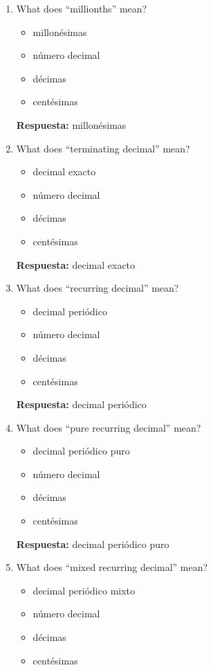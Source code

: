 \documentclass[11pt,a4paper]{article}
\begin{document}
\begin{enumerate}
\begin{itemize}
\item cienmilésimas
\item número decimal
\item décimas
\item centésimas
\end{itemize}
\textbf{Respuesta:} cienmilésimas
\item What does ``millionths'' mean?
\begin{itemize}
\item millonésimas
\item número decimal
\item décimas
\item centésimas
\end{itemize}
\textbf{Respuesta:} millonésimas
\item What does ``terminating decimal'' mean?
\begin{itemize}
\item decimal exacto
\item número decimal
\item décimas
\item centésimas
\end{itemize}
\textbf{Respuesta:} decimal exacto
\item What does ``recurring decimal'' mean?
\begin{itemize}
\item decimal periódico
\item número decimal
\item décimas
\item centésimas
\end{itemize}
\textbf{Respuesta:} decimal periódico
\item What does ``pure recurring decimal'' mean?
\begin{itemize}
\item decimal periódico puro
\item número decimal
\item décimas
\item centésimas
\end{itemize}
\textbf{Respuesta:} decimal periódico puro
\item What does ``mixed recurring decimal'' mean?
\begin{itemize}
\item decimal periódico mixto
\item número decimal
\item décimas
\item centésimas
\end{itemize}

\end{enumerate}
\end{document}
